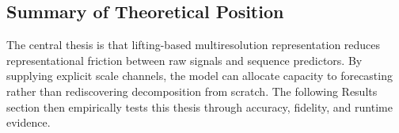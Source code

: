 \documentclass[journal]{IEEEtran}
\begin{document}
\subsection{Summary of Theoretical Position}
The central thesis is that lifting-based multiresolution representation reduces representational friction between raw signals and sequence predictors. By supplying explicit scale channels, the model can allocate capacity to forecasting rather than rediscovering decomposition from scratch. The following Results section then empirically tests this thesis through accuracy, fidelity, and runtime evidence.


%
%



%
%
\end{document}
